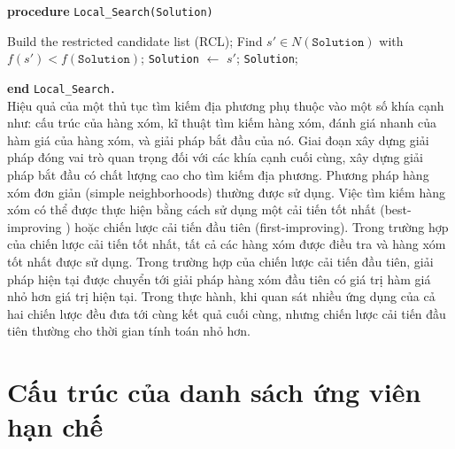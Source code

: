 \documentclass[14pt,a4paper]{report}
\begin{document}
{\bf procedure} \texttt{Local\_Search(Solution)}
\begin{algorithmic} [1] 
	\STATE Build the restricted candidate list (RCL);
	\STATE Find $s' \in N(\texttt{Solution})$ with $f(s') < f (\texttt{Solution})$;
	\STATE \texttt{Solution} $\leftarrow$ $s'$;
	\ENDWHILE
	 \texttt{Solution};
\end{algorithmic}
{\bf end} \texttt{Local\_Search.}\\

Hiệu quả của một thủ tục tìm kiếm địa phương phụ thuộc vào một số khía cạnh như: cấu trúc của hàng xóm, kĩ thuật tìm kiếm hàng xóm, đánh giá nhanh của hàm giá của hàng xóm, và giải pháp bắt đầu của nó. Giai đoạn xây dựng giải pháp đóng vai trò quan trọng đối với các khía cạnh cuối cùng, xây dựng giải pháp bắt đầu có chất lượng cao cho tìm kiếm địa phương. Phương pháp hàng xóm đơn giản (simple neighborhoods) thường được sử dụng. Việc tìm kiếm hàng xóm có thể được thực hiện bằng cách sử dụng một cải tiến tốt nhất (best-improving ) hoặc chiến lược cải tiến đầu tiên (first-improving). Trong trường hợp của chiến lược cải tiến tốt nhất, tất cả các hàng xóm được điều tra và hàng xóm tốt nhất được sử dụng. Trong trường hợp của chiến lược cải tiến đầu tiên, giải pháp hiện tại được chuyển tới giải pháp hàng xóm đầu tiên có giá trị hàm giá nhỏ hơn giá trị hiện tại. Trong thực hành, khi quan sát nhiều ứng dụng của cả hai chiến lược đều đưa tới cùng kết quả cuối cùng, nhưng chiến lược cải tiến đầu tiên thường cho thời gian tính toán nhỏ hơn.


\chapter{Cấu trúc của danh sách ứng viên hạn chế}
\end{document}
